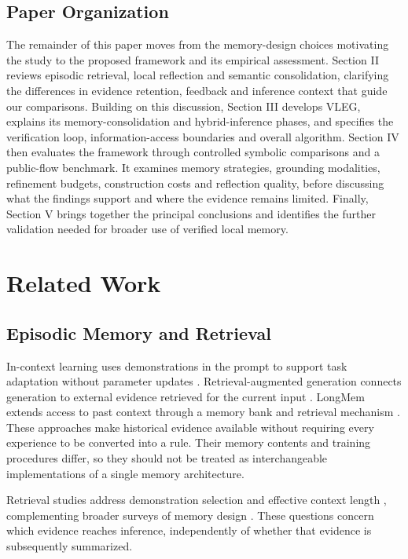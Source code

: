 \documentclass[journal]{IEEEtran}
\theoremstyle{definition}
\theoremstyle{remark}
\begin{document}
\subsection{Paper Organization}
The remainder of this paper moves from the memory-design choices motivating the study to the proposed framework and its empirical assessment. Section II reviews episodic retrieval, local reflection and semantic consolidation, clarifying the differences in evidence retention, feedback and inference context that guide our comparisons. Building on this discussion, Section III develops VLEG, explains its memory-consolidation and hybrid-inference phases, and specifies the verification loop, information-access boundaries and overall algorithm. Section IV then evaluates the framework through controlled symbolic comparisons and a public-flow benchmark. It examines memory strategies, grounding modalities, refinement budgets, construction costs and reflection quality, before discussing what the findings support and where the evidence remains limited. Finally, Section V brings together the principal conclusions and identifies the further validation needed for broader use of verified local memory.

\section{Related Work}
\subsection{Episodic Memory and Retrieval}
In-context learning uses demonstrations in the prompt to support task adaptation without parameter updates \cite{brown2020language}. Retrieval-augmented generation connects generation to external evidence retrieved for the current input \cite{lewis2020retrieval}. LongMem extends access to past context through a memory bank and retrieval mechanism \cite{wang2023longmem}. These approaches make historical evidence available without requiring every experience to be converted into a rule. Their memory contents and training procedures differ, so they should not be treated as interchangeable implementations of a single memory architecture.

Retrieval studies address demonstration selection \cite{zhang2022active,purohit2025sample} and effective context length \cite{an2024why}, complementing broader surveys of memory design \cite{wu2025from,zhang2024survey}. These questions concern which evidence reaches inference, independently of whether that evidence is subsequently summarized.
\end{document}
